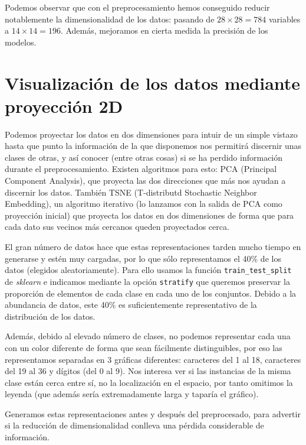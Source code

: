\documentclass[a4]{article}
\begin{document}
Podemos observar que con el preprocesamiento hemos conseguido reducir
notablemente la dimensionalidad de los datos: pasando de
$28\times 28=784$ variables a $14\times 14=196$. Además, mejoramos en
cierta medida la precisión de los modelos.

\section{Visualización de los datos mediante proyección 2D}

Podemos proyectar los datos en dos dimensiones para intuir de un
simple vistazo hasta que punto la información de la que disponemos nos
permitirá discernir unas clases de otras, y así conocer (entre otras
cosas) si se ha perdido información durante el
preprocesamiento. Existen algoritmos para esto: PCA (Principal
Component Analysis), que proyecta las dos direcciones que más nos
ayudan a discernir los datos. También TSNE (T-distributd Stochastic
Neighbor Embedding), un algoritmo iterativo (lo lanzamos con la salida
de PCA como proyección inicial) que proyecta los datos en dos
dimensiones de forma que para cada dato sus vecinos más cercanos
queden proyectados cerca.

El gran número de datos hace que estas representaciones tarden mucho
tiempo en generarse y estén muy cargadas, por lo que sólo
representamos el 40\% de los datos (elegidos aleatoriamente). Para
ello usamos la función \texttt{train\_test\_split} de
\textit{sklearn} e indicamos mediante la opción \texttt{stratify} que
queremos preservar la proporción de elementos de cada clase en cada
uno de los conjuntos. Debido a la abundancia de datos, este 40\% es
suficientemente representativo de la distribución de los datos.

Además, debido al elevado número de clases, no podemos representar
cada una con un color diferente de forma que sean fácilmente
distinguibles, por eso las representamos separadas en 3 gráficas
diferentes: caracteres del 1 al 18, caracteres del 19 al 36 y dígitos
(del 0 al 9). Nos interesa ver si las instancias de la misma clase
están cerca entre sí, no la localización en el espacio, por tanto
omitimos la leyenda (que además sería extremadamente larga y taparía
el gráfico).

Generamos estas representaciones antes y después del preprocesado,
para advertir si la reducción de dimensionalidad conlleva una pérdida
considerable de información.
\end{document}
